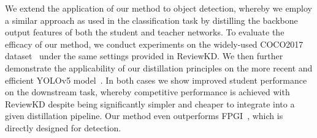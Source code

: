 \documentclass[letterpaper]{article} \usepackage[submission]{aaai23}  \usepackage{times}  \usepackage{helvet}  \usepackage{courier}  \usepackage[hyphens]{url}  \usepackage{graphicx} \urlstyle{rm} \def\UrlFont{\rm}  \usepackage{natbib}  \usepackage{caption} \frenchspacing  \setlength{\pdfpagewidth}{8.5in} \setlength{\pdfpageheight}{11in} \usepackage{algorithm}
\begin{document}
We extend the application of our method to object detection, whereby we employ a similar approach as used in the classification task by distilling the backbone output features of both the student and teacher networks. To evaluate the efficacy of our method, we conduct experiments on the widely-used COCO2017 dataset~\cite{Lin2014MicrosoftContext} under the same settings provided in ReviewKD. We then further demonstrate the applicability of our distillation principles on the more recent and efficient YOLOv5 model~\cite{Zhu2021TPH-YOLOv5:Scenarios}. In both cases we show improved student performance on the downstream task, whereby competitive performance is achieved with ReviewKD despite being significantly simpler and cheaper to integrate into a given distillation pipeline. Our method even outperforms FPGI~\cite{Wang2019DistillingImitationb}, which is directly designed for detection.

\begin{table}[ht]
    \centering
    \caption{\textbf{Object detection on COCO.} (top) We report the standard COCO metric of mAP averaged over IOU thresholds in [0.5 : 0.05 : 0.95] along with the standard PASCAL VOC’s metric~\cite{Everingham2010TheChallenge}, which is the average mAP@0.5. (bottom) For the R-CNN results, we report the mAP and AP50 metrics to enable a consistent comparison with ReviewKD.}
    \label{table:yolo}
\end{table} 
\end{document}
